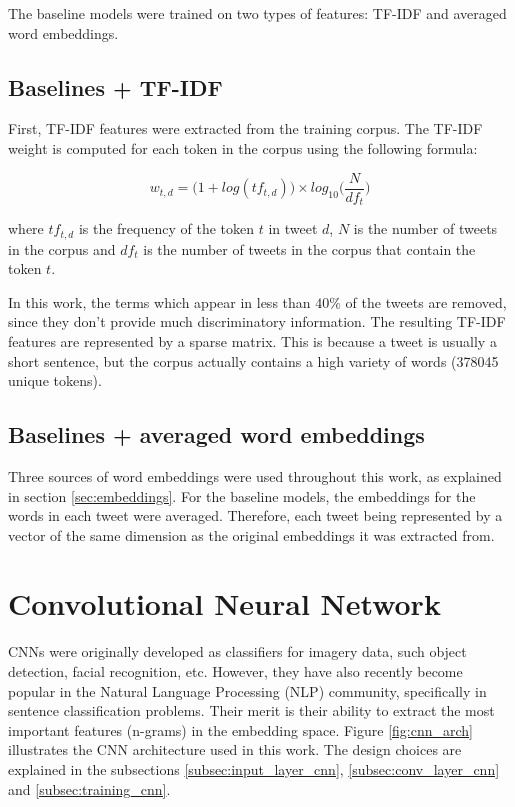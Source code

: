 \documentclass[10pt,conference,compsocconf]{IEEEtran}
\begin{document}
The baseline models were trained on two types of features: TF-IDF and averaged word embeddings.

\subsection{Baselines + TF-IDF} \label{baselines_tfidf} 

First, TF-IDF features were extracted from the training corpus. The TF-IDF weight is computed for each token in the corpus using the following formula:

\begin {dmath} \label{eq:convolution}
w_{t,d} = \Big( 1 + log (tf_{t,d}) \Big) \times log_{10}\Big(\frac{N}{df_t} \Big)
\end{dmath}

where $tf_{t,d}$ is the frequency of the token $t$ in tweet $d$, $N$ is the number of tweets in the corpus and $df_t$ is the number of tweets in the corpus that contain the token $t$.

In this work, the terms which appear in less than $40\%$ of the tweets are removed, since they don't provide much discriminatory information. The resulting TF-IDF features are represented by a sparse matrix. This is because a tweet is usually a short sentence, but the corpus actually contains a high variety of words (378045 unique tokens).

\subsection{Baselines + averaged word embeddings} \label{baselines_we} 

Three sources of word embeddings were used throughout this work, as explained in section \ref{sec:embeddings}. For the baseline models, the embeddings for the words in each tweet were averaged. Therefore, each tweet being represented by a vector of the same dimension as the original embeddings it was extracted from.

\section{Convolutional Neural Network}
\label{sec:CNN}

CNNs were originally developed as classifiers for imagery data, such object detection, facial recognition, etc. However, they have also recently become popular in the Natural Language Processing (NLP) community, specifically in sentence classification problems. Their merit is their ability to extract the most important features (n-grams) in the embedding space. Figure \ref{fig:cnn_arch} illustrates the CNN architecture used in this work. The design choices are explained in the subsections \ref{subsec:input_layer_cnn}, \ref{subsec:conv_layer_cnn} and \ref{subsec:training_cnn}.
\end{document}
